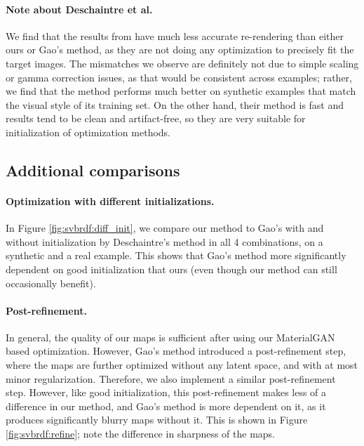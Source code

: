 

\paragraph{Note about Deschaintre et al.}
We find that the results from \cite{Deschaintre2019} have much less accurate re-rendering than either ours or Gao's method, as they are not doing any optimization to precisely fit the target images. The mismatches we observe are definitely not due to simple scaling or gamma correction issues, as that would be consistent across examples; rather, we find that the method performs much better on synthetic examples that match the visual style of its training set. On the other hand, their method is fast and results tend to be clean and artifact-free, so they are very suitable for initialization of optimization methods.


\subsection{Additional comparisons}



\paragraph{Optimization with different initializations.}
In Figure \ref{fig:svbrdf:diff_init}, we compare our method to Gao's with and without initialization by Deschaintre's method in all 4 combinations, on a synthetic and a real example. This shows that Gao's method more significantly dependent on good initialization that ours (even though our method can still occasionally benefit).



\paragraph{Post-refinement.}
In general, the quality of our maps is sufficient after using our MaterialGAN based optimization. However, Gao's method introduced a post-refinement step, where the maps are further optimized without any latent space, and with at most minor regularization. Therefore, we also implement a similar post-refinement step. However, like good initialization, this post-refinement makes less of a difference in our method, and Gao's method is more dependent on it, as it produces significantly blurry maps without it. This is shown in Figure \ref{fig:svbrdf:refine}; note the difference in sharpness of the maps.

